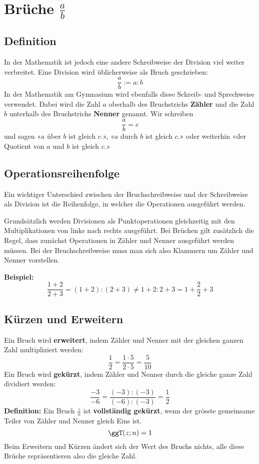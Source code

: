 \newpage
\section{Brüche $\frac{a}{b}$}

\subsection{Definition}

In der Mathematik ist jedoch eine andere Schreibweise der Division viel weiter verbreitet. Eine Division wird üblicherweise als Bruch geschrieben:
\[
  \frac{a}{b} := a:b
\]
In der Mathematik am Gymnasium wird ebenfalls diese Schreib- und Sprechweise verwendet. Dabei wird die Zahl $a$ oberhalb des Bruchstrichs \textbf{Zähler} und die Zahl $b$ unterhalb des Bruchstrichs \textbf{Nenner} genannt. Wir schreiben
\[
  \frac{a}{b} = c
\]
und sagen «$a$ über $b$ ist gleich $c$.», «$a$ durch $b$ ist gleich $c$.» oder weiterhin «der Quotient von $a$ und $b$ ist gleich $c$.»

\subsection{Operationsreihenfolge}

Ein wichtiger Unterschied zwischen der Bruchschreibweise und der Schreibweise als Division ist die Reihenfolge, in welcher die Operationen ausgeführt werden.

Grundsätzlich werden Divisionen als Punktoperationen gleichzeitig mit den Multiplikationen von links nach rechts ausgeführt. Bei Brüchen gilt zusätzlich die Regel, dass zunächst Operationen in Zähler und Nenner ausgeführt werden müssen. Bei der Bruchschreibweise muss man sich also Klammern um Zähler und Nenner vorstellen.
\begin{example}
\textbf{Beispiel:}
\[
  \frac{1+2}{2+3} = (1+2):(2+3) \ne 1+2:2+3 = 1+\frac{2}{2}+3
\]
\end{example}

\subsection{Kürzen und Erweitern}

Ein Bruch wird \textbf{erweitert}, indem Zähler und Nenner mit der gleichen ganzen Zahl multipliziert werden:
\[
  \frac{1}{2} = \frac{1\cdot 5}{2\cdot 5} = \frac{5}{10}
\]
Ein Bruch wird \textbf{gekürzt}, indem Zähler und Nenner durch die gleiche ganze Zahl dividiert werden:
\[
  \frac{-3}{-6} = \frac{(-3):(-3)}{(-6):(-3)} = \frac{1}{2}
\]
\textbf{Definition:} Ein Bruch $\frac{z}{n}$ ist \textbf{vollständig gekürzt}, wenn der grösste gemeinsame Teiler von Zähler und Nenner gleich Eins ist.
\[
  \ggT(z;n) = 1
\]
Beim Erweitern und Kürzen ändert sich der Wert des Bruchs nichts, alle diese Brüche repräsentieren also die gleiche Zahl.

